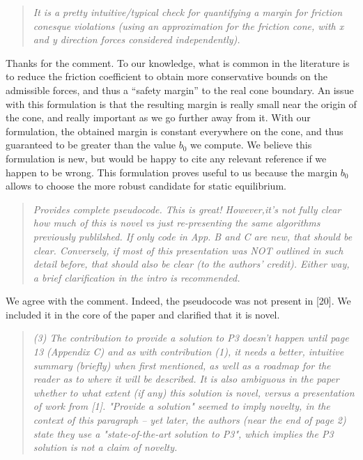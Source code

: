 \documentclass[a4paper]{article}
\begin{document}
\begin{quote}  \textit{It is a pretty intuitive/typical check for quantifying a
margin for friction conesque violations (using an approximation for
the friction cone, with x and y direction forces considered
independently). }
\end{quote}
Thanks for the comment. To our knowledge, what is common in the literature is to reduce the friction coefficient to obtain more conservative bounds on the admissible forces, and thus a ``safety margin'' to the real cone boundary. An issue with this formulation is that the resulting margin is really small near the origin of the cone, and really important as we go further away from it. With our formulation, the obtained margin is constant everywhere on the cone, and thus guaranteed to be greater than the value $b_0$ we compute. We believe this formulation is new, but would be happy to cite any relevant reference if we happen to be wrong. This formulation proves useful to us because the margin $b_0$ allows to choose the more robust candidate for static equilibrium.

\begin{quote}  \textit{
Provides complete pseudocode.  This is great! However,it's
not fully clear how much of this is novel vs just re-presenting the
same algorithms previously publilshed.	If only code in App. B and C
are new, that should be clear. Conversely, if most of this presentation
was NOT outlined in such detail before, that should also be clear (to
the authors' credit). Either way, a brief clarification in the intro is
recommended.}
\end{quote}

We agree with the comment. Indeed, the pseudocode was not present in [20]. We included it in the core of the paper and clarified that it is novel.


\begin{quote}  \textit{(3)	The contribution to provide a solution to P3 doesn't happen
until page 13 (Appendix C) and as with contribution (1), it needs a
better, intuitive summary (briefly) when first mentioned, as well as a
roadmap for the reader as to where it will be described. It is also
ambiguous in the paper whether to what extent (if any) this solution is
novel, versus a presentation of work from [1]. "Provide a solution"
seemed to imply novelty, in the context of this paragraph -- yet later,
the authors (near the end of page 2) state they use a "state-of-the-art
solution to P3", which implies the P3 solution is not a claim of
novelty.}
\end{quote}
\end{document}

